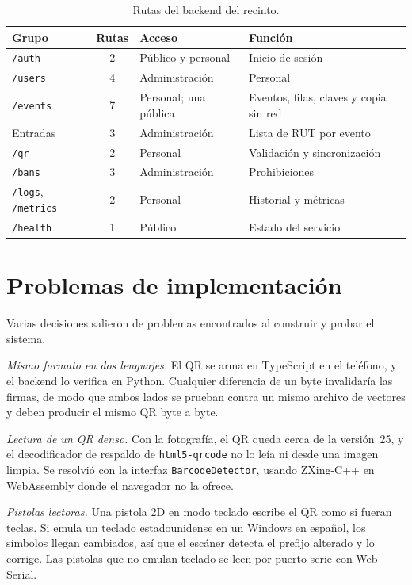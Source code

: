 \begin{table}[htbp]
  \centering
  \caption{Rutas del backend del recinto.}
  \label{tab:desarrollo-api}
  \small
  \begin{tabular}{p{3.2cm}cp{4.4cm}p{4.4cm}}
    \toprule
    Grupo & Rutas & Acceso & Función \\
    \midrule
    \texttt{/auth} & 2 & Público y personal & Inicio de sesión \\
    \texttt{/users} & 4 & Administración & Personal \\
    \texttt{/events} & 7 & Personal; una pública & Eventos, filas, claves y copia sin red \\
    Entradas & 3 & Administración & Lista de RUT por evento \\
    \texttt{/qr} & 2 & Personal & Validación y sincronización \\
    \texttt{/bans} & 3 & Administración & Prohibiciones \\
    \texttt{/logs}, \texttt{/metrics} & 2 & Personal & Historial y métricas \\
    \texttt{/health} & 1 & Público & Estado del servicio \\
    \bottomrule
  \end{tabular}
\end{table}

\section{Problemas de implementación}
\label{sec:desarrollo-implementacion}

Varias decisiones salieron de problemas encontrados al construir y probar el sistema.

\emph{Mismo formato en dos lenguajes.} El QR se arma en TypeScript en el teléfono, y el backend lo verifica en
Python. Cualquier diferencia de un byte invalidaría las firmas, de modo que ambos lados se prueban contra un mismo
archivo de vectores y deben producir el mismo QR byte a byte.

\emph{Lectura de un QR denso.} Con la fotografía, el QR queda cerca de la versión~25, y el decodificador de
respaldo de \texttt{html5-qrcode} no lo leía ni desde una imagen limpia. Se resolvió con la interfaz
\texttt{BarcodeDetector}, usando ZXing-C++ en WebAssembly donde el navegador no la ofrece.

\emph{Pistolas lectoras.} Una pistola 2D en modo teclado escribe el QR como si fueran teclas. Si emula un teclado
estadounidense en un Windows en español, los símbolos llegan cambiados, así que el escáner detecta el prefijo
alterado y lo corrige. Las pistolas que no emulan teclado se leen por puerto serie con Web Serial.

